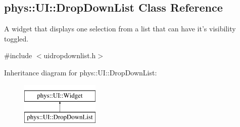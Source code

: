 \hypertarget{classphys_1_1UI_1_1DropDownList}{
\subsection{phys::UI::DropDownList Class Reference}
\label{classphys_1_1UI_1_1DropDownList}
}


A widget that displays one selection from a list that can have it's visibility toggled.  




{\ttfamily \#include $<$uidropdownlist.h$>$}

Inheritance diagram for phys::UI::DropDownList:\begin{figure}[H]
\begin{center}
\leavevmode
\includegraphics[height=2.000000cm]{classphys_1_1UI_1_1DropDownList}
\end{center}
\end{figure}
